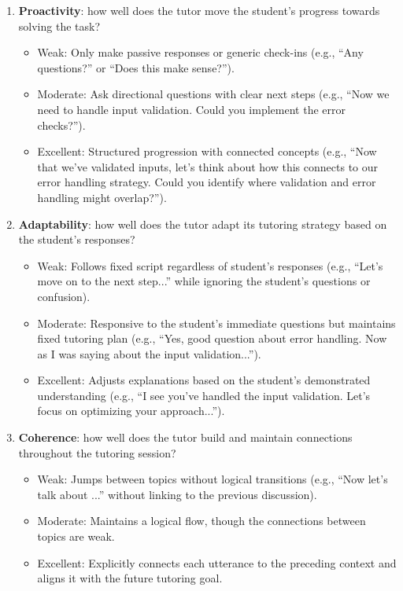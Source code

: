 \begin{enumerate}[label=(\arabic*)]
\item \textbf{Proactivity}: how well does the tutor move the student's progress towards solving the task?
\begin{itemize}[leftmargin=4pt]
    \item Weak: Only make passive responses or generic check-ins (e.g., ``Any questions?'' or ``Does this make sense?'').
    \item Moderate: Ask directional questions with clear next steps (e.g., ``Now we need to handle input validation. Could you implement the error checks?'').
    \item Excellent: Structured progression with connected concepts (e.g., ``Now that we've validated inputs, let's think about how this connects to our error handling strategy. Could you identify where validation and error handling might overlap?'').
\end{itemize}
\item \textbf{Adaptability}: how well does the tutor adapt its tutoring strategy based on the student's responses?
\begin{itemize}[leftmargin=4pt]
    \item Weak: Follows fixed script regardless of student's responses (e.g., ``Let's move on to the next step...'' while ignoring the student's questions or confusion).
    \item Moderate: Responsive to the student's immediate questions but maintains fixed tutoring plan (e.g., ``Yes, good question about error handling. Now as I was saying about the input validation...'').
    \item Excellent: Adjusts explanations based on the student's demonstrated understanding (e.g., ``I see you've handled the input validation. Let's focus on optimizing your approach...'').
\end{itemize}
\item \textbf{Coherence}: how well does the tutor build and maintain connections throughout the tutoring session?
\begin{itemize}[leftmargin=4pt]
    \item Weak: Jumps between topics without logical transitions (e.g., ``Now let's talk about ...'' without linking to the previous discussion).
    \item Moderate: Maintains a logical flow, though the connections between topics are weak.
    \item Excellent: Explicitly connects each utterance to the preceding context and aligns it with the future tutoring goal.
\end{itemize}
\end{enumerate}

